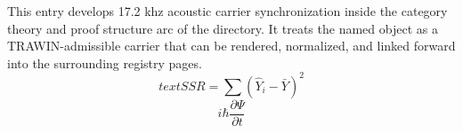 
\begin{tzpsnapshot}
\end{tzpsnapshot}

This entry develops 17.2 khz acoustic carrier synchronization inside the category theory and proof structure arc of the directory. It treats the named object as a TRAWIN-admissible carrier that can be rendered, normalized, and linked forward into the surrounding registry pages.
\[
text{SSR} = \sum (\hat{Y}_i - \bar{Y})^2
\]
\[
i\hbar \frac{\partial \Psi}{\partial t}
\]


